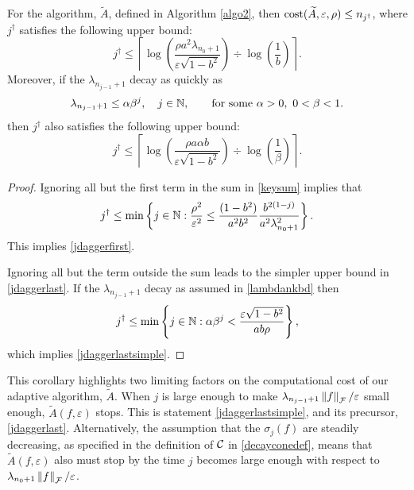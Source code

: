 \documentclass[graybox,footinfo]{svmult}
\newcommand{\DHJRnorm}[2][{}]{\ensuremath{\left \lVert #2 \right \rVert}_{#1}}
\begin{document}
\begin{corollary} For the algorithm, $\widetilde{A}$, defined in Algorithm \ref{algo2}, then $\textup{cost}(\widetilde{A},\varepsilon,\rho) \le n_{j^\dagger}$, where $j^\dagger$ satisfies the following upper bound:
\begin{equation} \label{jdaggerfirst}
j^\dagger \le \left \lceil \log\left(\frac{\rho a^2\lambda_{n_{0}+1} }{\varepsilon \sqrt{1 - b^2}}\right) \div \log\left(\frac{1}{b}\right) \right \rceil.
\end{equation}
Moreover, if the $\lambda_{n_{j-1}+1}$ decay as quickly as
\begin{equation}
\label{lambdankbd}
\lambda_{n_{j-1}+1} \le \alpha \beta^j,  \quad j \in \bbN,  \qquad \text{for some } \alpha > 0, \ 0 < \beta < 1.
\end{equation}
then $j^\dagger$ also satisfies the following upper bound:
\begin{equation}
\label{jdaggerlastsimple}
j^\dagger \le
\left \lceil \log\left(\frac{\rho a\alpha b }{\varepsilon \sqrt{1 - b^2}}\right) \div \log\left(\frac{1}{\beta}\right) \right \rceil.
\end{equation}
\end{corollary}

\begin{proof}
Ignoring all but the first term in the sum in \eqref{keysum} implies that 
\begin{equation} \label{jsumupperbd}
j^\dagger \le \min \left \{j \in \bbN : \frac{\rho^2}{\varepsilon^2} \le \frac{(1 - b^2)}{a^2b^2} \frac{b^{2(1-j)}}{a^2\lambda_{n_{0}+1}^2}    \right\}.
\end{equation}
This implies \eqref{jdaggerfirst}.

Ignoring all but the term outside the sum leads to the simpler upper bound in \eqref{jdaggerlast}.  If the $\lambda_{n_{j-1}+1}$ decay as assumed in \eqref{lambdankbd} then
\[
j^\dagger \le \min \left \{j \in {\mathbb{N}} :  \alpha \beta^j < \frac{\varepsilon\sqrt{1 - b^2}}{ab \rho} \right\},
\]
which implies \eqref{jdaggerlastsimple}.
\end{proof}

This corollary highlights two limiting factors on the computational cost of our adaptive algorithm, $\widetilde{A}$. When $j$ is large enough to make $\lambda_{n_{j-1}+1}\DHJRnorm[\calF]{f}/\varepsilon$ small enough, $\widetilde{A}(f,\varepsilon)$ stops.  This is statement \eqref{jdaggerlastsimple}, and its precursor, \eqref{jdaggerlast}.  Alternatively, the assumption that the $\sigma_j(f)$ are steadily decreasing, as specified in the definition of ${\mathcal{C}}$ in \eqref{decayconedef}, means that $\widetilde{A}(f,\varepsilon)$ also must stop by the time $j$ becomes large enough with respect to $\lambda_{n_0+1}\DHJRnorm[\calF]{f}/\varepsilon$.
\end{document}
